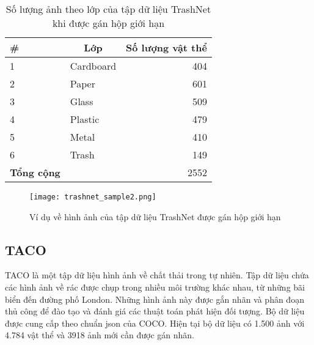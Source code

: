 \documentclass[../the.tex]{subfiles}
\begin{document}
\begin{table}[!ht]
	\centering
	\caption{Số lượng ảnh theo lớp của tập dữ liệu TrashNet khi được gán hộp giới hạn}
	\begin{tabular}{|l|l|r|}
		\hline
		\multicolumn{1}{|l|}{
			\textbf{\#}}
		 & \multicolumn{1}{c|}{\textbf{Lớp}}
		 & \multicolumn{1}{c|}{\textbf{Số lượng vật thể}} \\
		\hline

		1
		 & Cardboard
		 & 404                                            \\
		\hline

		2
		 & Paper
		 & 601                                            \\
		\hline

		3
		 & Glass
		 & 509                                            \\
		\hline

		4
		 & Plastic
		 & 479                                            \\
		\hline

		5
		 & Metal
		 & 410                                            \\
		\hline

		6
		 & Trash
		 & 149                                            \\
		\hline


		\textbf{Tổng cộng}
		 &
		 & 2552                                           \\
		\hline
	\end{tabular}

	\label{tab:dataset1}
\end{table}

\begin{figure}[H]
	\centering
	\texttt{[image: trashnet\_sample2.png]}
	\caption{Ví dụ về hình ảnh của tập dữ liệu TrashNet được gán hộp giới hạn}
	\label{fig:dataset_1}
\end{figure}

\subsection{TACO}
\label{sec:TACO}
{\fontsize{13}{12} \selectfont

	TACO là một tập dữ liệu hình ảnh về chất thải trong tự nhiên. Tập dữ liệu chứa các hình ảnh về rác được chụp trong nhiều môi trường khác nhau, từ những bãi biển đến đường phố London. Những hình ảnh này được gắn nhãn và phân đoạn thủ công để đào tạo và đánh giá các thuật toán phát hiện đối tượng.
	Bộ dữ liệu được cung cấp
	theo chuẩn json của COCO. Hiện tại bộ dữ liệu có 1.500 ảnh với 4.784 vật thể
	và 3918 ảnh mới cần được gán nhãn.

}
\end{document}
